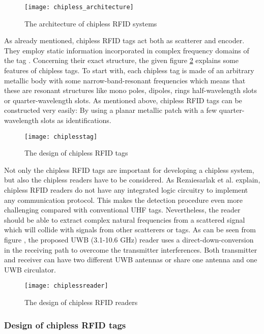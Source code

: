 \begin{figure}
\centering
\texttt{[image: chipless\_architecture]}
\caption{\label{fig:chipless_architecture} The architecture of chipless RFID systems \cite[p.17]{chipless}} 
\end{figure}

As already mentioned, chipless RFID tags act both as scatterer and encoder. They employ static information incorporated in complex frequency domains of the tag \cite[p.18 ff.]{chipless}. Concerning their exact structure, the given figure \ref{fig:chipless_tag} explains some features of chipless tags. To start with, each chipless tag is made of an arbitrary metallic body with some narrow-band-resonant frequencies which means that these are resonant structures like mono poles, dipoles, rings half-wavelength slots or quarter-wavelength slots. 
As mentioned above, chipless RFID tags can be constructed very easily: By using a planar metallic patch with a few quarter-wavelength slots as identifications.

\begin{figure}
\centering
\texttt{[image: chiplesstag]}
\caption{\label{fig:chipless_tag} The design of chipless RFID tags \cite[p.19]{chipless}} 
\end{figure}

Not only the chipless RFID tags are important for developing a chipless system, but also the chipless readers have to be considered. As Rezaiesarlak et al. \cite[p.18 ff.]{chipless} explain, chipless RFID readers do not have any integrated logic circuitry to implement any communication protocol. This makes the detection procedure even more challenging compared with conventional UHF tags. Nevertheless, the reader should be able to extract complex natural frequencies from a scattered signal which will collide with signals from other scatterers or tags. 
As can be seen from figure \pageref{fig:chipless_reader}, the proposed \ac{UWB} (3.1-10.6 GHz) reader uses a direct-down-conversion in the receiving path to overcome the transmitter interferences. Both transmitter and receiver can have two different UWB antennas or share one antenna and one UWB circulator.   

\begin{figure}
\centering
\texttt{[image: chiplessreader]}
\caption{\label{fig:chipless_reader} The design of chipless RFID readers \cite[p.20]{chipless}} 
\end{figure}

\subsubsection{Design of chipless RFID tags} 

